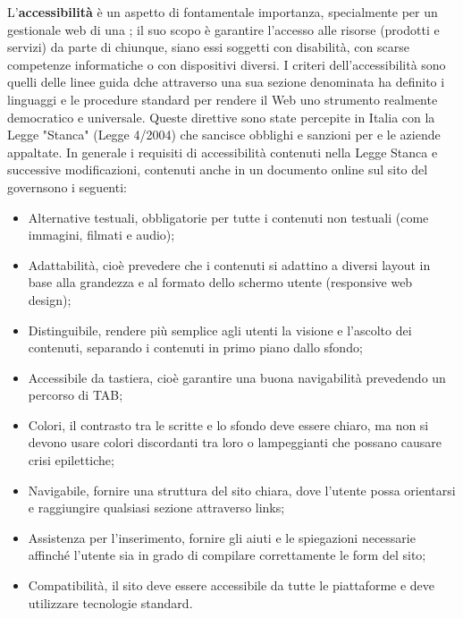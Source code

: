 L'\textbf{accessibilità} è un aspetto di fontamentale importanza, specialmente per un gestionale web di una ; il suo scopo è garantire l'accesso alle risorse (prodotti e servizi) da parte di chiunque, siano essi soggetti con disabilità, con scarse competenze informatiche o con dispositivi diversi.
I criteri dell'accessibilità sono quelli delle linee guida dche attraverso una sua sezione denominata ha definito i linguaggi e le procedure standard per rendere il Web uno strumento realmente democratico e universale.
Queste direttive sono state percepite in Italia con la Legge "Stanca" (Legge 4/2004) che sancisce obblighi e sanzioni per e le aziende appaltate.
In generale i requisiti di accessibilità contenuti nella Legge Stanca e successive modificazioni, contenuti anche in un documento online sul sito del governsono i seguenti:
\begin{itemize}
    \item Alternative testuali, obbligatorie per tutte i contenuti non testuali (come immagini, filmati e audio);
    \item Adattabilità, cioè prevedere che i contenuti si adattino a diversi layout in base alla grandezza e al formato dello schermo utente (responsive web design);
    \item Distinguibile, rendere più semplice agli utenti la visione e l'ascolto dei contenuti, separando i contenuti in primo piano dallo sfondo;
    \item Accessibile da tastiera, cioè garantire una buona navigabilità prevedendo un percorso di TAB;
    \item Colori, il contrasto tra le scritte e lo sfondo deve essere chiaro, ma non si devono usare colori discordanti tra loro o lampeggianti che possano causare crisi epilettiche;
    \item Navigabile, fornire una struttura del sito chiara, dove l'utente possa orientarsi e raggiungire qualsiasi sezione attraverso links;
    \item Assistenza per l'inserimento, fornire gli aiuti e le spiegazioni necessarie affinché l'utente sia in grado di compilare correttamente le form del sito;
    \item Compatibilità, il sito deve essere accessibile da tutte le piattaforme e deve utilizzare tecnologie standard.
\end{itemize}
